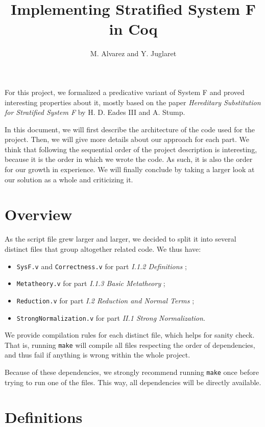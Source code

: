 \documentclass[a4paper,11pt]{article}
\begin{document}
\title{Implementing Stratified System F in Coq}
\author{M. Alvarez and Y. Juglaret}
\date{}
\maketitle

For this project, we formalized a predicative variant of System F and
proved interesting properties about it, mostly based on the paper
\emph{Hereditary Substitution for Stratified System F} by H. D. Eades
III and A. Stump.

In this document, we will first describe the architecture of the code
used for the project. Then, we will give more details about our
approach for each part. We think that following the sequential order
of the project description is interesting, because it is the order in
which we wrote the code. As such, it is also the order for our growth
in experience. We will finally conclude by taking a larger look at our
solution as a whole and criticizing it.

\section*{Overview}

As the script file grew larger and larger, we decided to split it into
several distinct files that group altogether related code. We thus
have:

\begin{itemize}
  \item \verb|SysF.v| and \verb|Correctness.v| for part \emph{I.1.2
    Definitions} ;
  \item \verb|Metatheory.v| for part \emph{I.1.3 Basic Metatheory} ;
  \item \verb|Reduction.v| for part \emph{I.2 Reduction and Normal
    Terms} ;
  \item \verb|StrongNormalization.v| for part \emph{II.1 Strong
    Normalization}.
\end{itemize}

We provide compilation rules for each distinct file, which helps
for sanity check. That is, running \verb|make| will compile all files
respecting the order of dependencies, and thus fail if anything is
wrong within the whole project.

Because of these dependencies, we strongly recommend running
\verb|make| once before trying to run one of the files. This way, all
dependencies will be directly available.

\section{Definitions}
\end{document}

